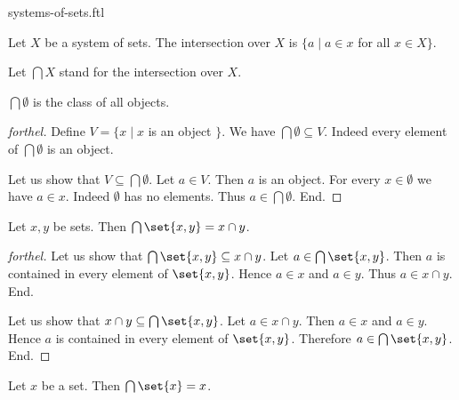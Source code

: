 \documentclass{naproche-library}
\begin{document}
\begin{smodule}{systems-of-sets.ftl}
  \begin{definition}[forthel,id=FOUNDATIONS_10_2659345095458816]
    Let $X$ be a system of sets.
    The intersection over $X$ is $\{ a \mid a \in x$ for all $x \in X \}$.

    Let $\bigcap X$ stand for the intersection over $X$.
  \end{definition}

  \begin{proposition}[forthel,id=FOUNDATIONS_10_2809770322952192]
    $\bigcap \emptyset$ is the class of all objects.
  \end{proposition}
  \begin{proof}[forthel]
    Define $V = \{ x \mid x$ is an object $\}$.
    We have $\bigcap \emptyset \subseteq V$.
    Indeed every element of $\bigcap \emptyset$ is an object.

    Let us show that $V \subseteq \bigcap \emptyset$.
      Let $a \in V$.
      Then $a$ is an object.
      For every $x \in \emptyset$ we have $a \in x$.
      Indeed $\emptyset$ has no elements.
      Thus $a \in \bigcap \emptyset$.
    End.
  \end{proof}

  \begin{proposition}[forthel,id=FOUNDATIONS_10_7851827447988224]
    Let $x, y$ be sets.
    Then $\bigcap \set{x, y} = x \cap y$.
  \end{proposition}
  \begin{proof}[forthel]
    Let us show that $\bigcap \set{x, y} \subseteq x \cap y$.
      Let $a \in \bigcap \set{x, y}$.
      Then $a$ is contained in every element of $\set{x, y}$.
      Hence $a \in x$ and $a \in y$.
      Thus $a \in x \cap y$.
    End.

    Let us show that $x \cap y \subseteq \bigcap \set{x, y}$.
      Let $a \in x \cap y$.
      Then $a \in x$ and $a \in y$.
      Hence $a$ is contained in every element of $\set{x, y}$.
      Therefore $a \in \bigcap \set{x, y}$.
    End.
  \end{proof}

  \begin{corollary}[forthel,id=FOUNDATIONS_10_7239895674257408]
    Let $x$ be a set.
    Then $\bigcap \set{x} = x$.
  \end{corollary}
\end{smodule}
\end{document}
